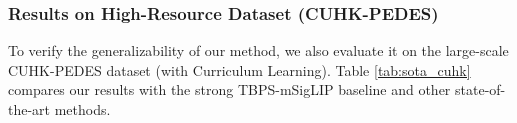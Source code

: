 \documentclass[conference]{IEEEtran}
\begin{document}
\begin{table}[htbp]
    \centering
    \vspace{-0.5em} 
    \caption{Comparison with SOTA methods on 3000VnPersonSearch. Best results are in bold.}
    \label{tab:sota_vn}
    \vspace{-1em} 
\end{table}

\subsubsection{Results on High-Resource Dataset (CUHK-PEDES)}
To verify the generalizability of our method, we also evaluate it on the large-scale CUHK-PEDES dataset (with Curriculum Learning). Table \ref{tab:sota_cuhk} compares our results with the strong TBPS-mSigLIP baseline and other state-of-the-art methods.
\end{document}
